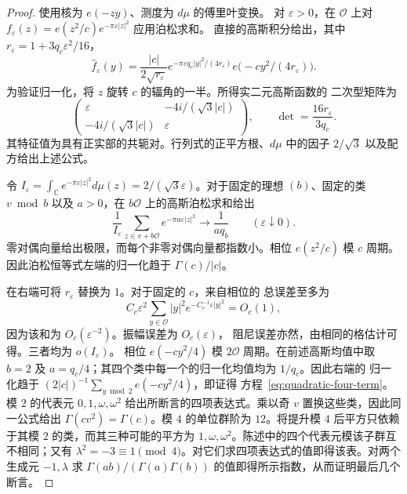 \documentclass[11pt,a4paper]{article}
\numberwithin{equation}{section}
\numberwithin{figure}{section}
\theoremstyle{definition}
\theoremstyle{remark}
\begin{document}
\begin{proof}
使用核为 $e(-zy)$、测度为 $d\mu$ 的傅里叶变换。
对 $\varepsilon>0$，在 $\mathcal O$ 上对
$f_\varepsilon(z)=e(z^2/c)e^{-\pi\varepsilon|z|^2}$ 应用泊松求和。
直接的高斯积分给出，其中 $r_\varepsilon=1+3q_c\varepsilon^2/16$，
\[
 \widehat f_\varepsilon(y)
 =\frac{|c|}{2\sqrt{r_\varepsilon}}
    e^{-\pi\varepsilon q_c|y|^2/(4r_\varepsilon)}
    e\bigl(-cy^2/(4r_\varepsilon)\bigr).
\]
为验证归一化，将 $z$ 旋转 $c$ 的辐角的一半。所得实二元高斯函数的
二次型矩阵为
\[
 \begin{pmatrix}
 \varepsilon&-4i/(\sqrt3|c|)\\
 -4i/(\sqrt3|c|)&\varepsilon
 \end{pmatrix},
 \qquad \det=\frac{16r_\varepsilon}{3q_c}.
\]
其特征值为具有正实部的共轭对。行列式的正平方根、$d\mu$ 中的因子
$2/\sqrt3$ 以及配方给出上述公式。

令 $I_\varepsilon=\int_{\mathbb C}e^{-\pi\varepsilon|z|^2}d\mu(z)
=2/(\sqrt3\varepsilon)$。对于固定的理想 $(b)$、固定的类 $v\bmod b$
以及 $a>0$，在 $b\mathcal O$ 上的高斯泊松求和给出
\[
 \frac1{I_\varepsilon}\sum_{z\in v+b\mathcal O}
             e^{-\pi a\varepsilon|z|^2}
 \longrightarrow\frac1{a q_b}\qquad(\varepsilon\downarrow0).
\]
零对偶向量给出极限，而每个非零对偶向量都指数小。相位 $e(z^2/c)$
模 $c$ 周期。因此泊松恒等式左端的归一化趋于 $\Gamma(c)/|c|$。

在右端可将 $r_\varepsilon$ 替换为 $1$。对于固定的 $c$，来自相位的
总误差至多为
\[
 C_c\varepsilon^2\sum_{y\in\mathcal O}|y|^2
                         e^{-C_c^{-1}\varepsilon|y|^2}=O_c(1),
\]
因为该和为 $O_c(\varepsilon^{-2})$。振幅误差为 $O_c(\varepsilon)$，
阻尼误差亦然，由相同的格估计可得。三者均为 $o(I_\varepsilon)$。
相位 $e(-cy^2/4)$ 模 $2\mathcal O$ 周期。在前述高斯均值中取 $b=2$
及 $a=q_c/4$；其四个类中每一个的归一化均值均为 $1/q_c$。因此右端的
归一化趋于 $(2|c|)^{-1}\sum_{y\bmod2}e(-cy^2/4)$，即证得
方程~\eqref{eq:quadratic-four-term}。模 $2$ 的代表元 $0,1,\omega,\omega^2$ 给出所断言的四项表达式。乘以奇 $v$ 置换这些类，因此同一公式给出 $\Gamma(cv^2)=\Gamma(c)$。模 $4$ 的单位群阶为 $12$。将提升模 $4$ 后平方只依赖于其模 $2$ 的类，而其三种可能的平方为 $1,\omega,\omega^2$。陈述中的四个代表元模该子群互不相同；又有 $\lambda^2=-3\equiv1\pmod4$。对它们求四项表达式的值即得该表。对两个生成元 $-1,\lambda$ 求 $\Gamma(ab)/(\Gamma(a)\Gamma(b))$ 的值即得所示指数，从而证明最后几个断言。
\end{proof}
\end{document}

